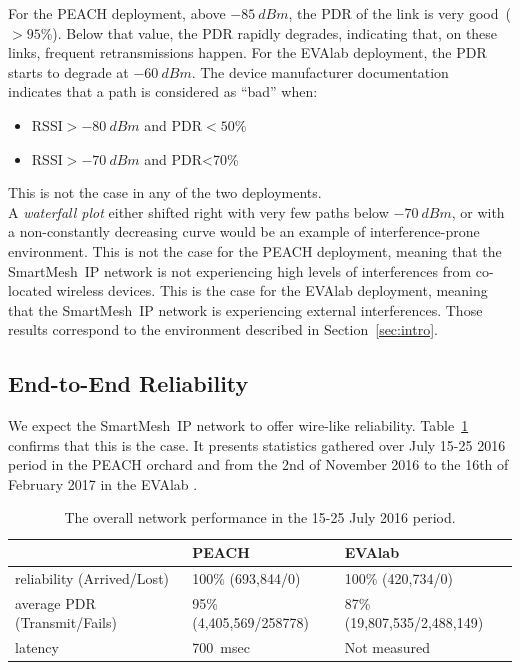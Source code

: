 \documentclass{elsarticle}
\newcommand{\smip}                {SmartMesh~IP\xspace}
\newcommand{\PEACHNUMPCKTS}       {693,844\xspace}
\newcommand{\EVANUMPCKTS}         {420,734\xspace}
\begin{document}
For the PEACH deployment, above $-85~dBm$, the PDR of the link is very good~($>95$\%).
Below that value, the PDR rapidly degrades, indicating that, on these links, frequent retransmissions happen.
For the EVAlab deployment, the PDR starts to degrade at $-60~dBm$.
The device manufacturer documentation~\cite{smip_app_note} indicates that a path is considered as ``bad'' when:

\begin{itemize}
    \item RSSI$>-80~dBm$ and PDR$<50$\%
    \item RSSI$>-70~dBm$ and PDR<70\%
\end{itemize}

This is not the case in any of the two deployments.\\


A \textit{waterfall plot} either shifted right with very few paths below $-70~dBm$, or with a non-constantly decreasing curve would be an example of interference-prone environment.
This is not the case for the PEACH deployment, meaning that the \smip network is not experiencing high levels of interferences from co-located wireless devices.
This is the case for the EVAlab deployment, meaning that the \smip network is experiencing external interferences.
Those results correspond to the environment described in Section~\ref{sec:intro}. 

\subsection{End-to-End Reliability}
\label{sec:net_reliability}


We expect the \smip network to offer wire-like reliability.
Table~\ref{tab:net_stats} confirms that this is the case.
It presents statistics gathered over July 15-25 2016 period in the PEACH orchard and from the 2nd of November 2016 to the 16th of February 2017 in the EVAlab	.

\begin{table}
    \begin{tabular}{|l|l|l|}
        \toprule
        {}	 							& PEACH 				  & EVAlab \\
        \midrule
        reliability (Arrived/Lost) 		& 100\% (\PEACHNUMPCKTS/0) 	  & 100\% (\EVANUMPCKTS/0)\\ \hline
        average PDR (Transmit/Fails) 	& 95\% (4,405,569/258778) & 87\% (19,807,535/2,488,149)\\ \hline
        latency     					& 700~msec 				  & Not measured\\
        \bottomrule
    \end{tabular}
    \caption{The overall network performance in the 15-25 July 2016 period.}
    \label{tab:net_stats}
\end{table}
\end{document}

